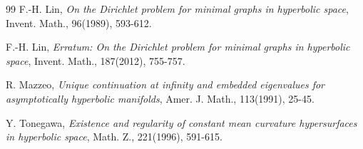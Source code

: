 \documentclass[11pt,reqno]{amsart}
\theoremstyle{definition}
\numberwithin{equation}{section}
\begin{document}
\begin{thebibliography}{99}
 F.-H. Lin,
{\it On the Dirichlet problem for minimal graphs in hyperbolic space},
Invent. Math., 96(1989), 593-612.

 F.-H. Lin,
{\it Erratum: On the Dirichlet problem for minimal graphs in hyperbolic space},
Invent. Math., 187(2012), 755-757.



 R. Mazzeo,
\emph{Unique continuation at infinity and embedded eigenvalues for asymptotically hyperbolic manifolds}, 
Amer. J. Math., 113(1991), 25-45.

 Y. Tonegawa, 
\emph{Existence and regularity of constant mean curvature hypersurfaces in hyperbolic space}, 
Math. Z., 221(1996), 591-615. 
\end{thebibliography}
\end{document}
